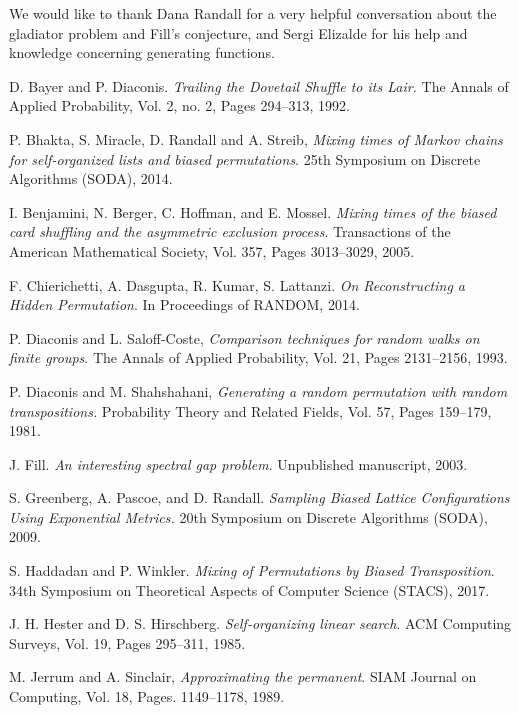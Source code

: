 \documentclass[10 pt]{article}
\begin{document}
We would like to thank Dana Randall for a very helpful conversation about the gladiator problem and Fill's conjecture,
and Sergi Elizalde for his help and knowledge concerning generating functions.  



\begin{thebibliography}{10}

  D. Bayer and P. Diaconis. \emph{Trailing the Dovetail Shuffle to its Lair.} The Annals of Applied Probability,
    Vol. 2, no. 2, Pages 294--313, 1992.

  P. Bhakta, S. Miracle, D. Randall and A. Streib, \emph{Mixing times of Markov chains for self-organized lists and biased permutations}. 25th Symposium on Discrete Algorithms (SODA), 2014.

 I. Benjamini, N. Berger, C. Hoffman, and E. Mossel. \emph{Mixing times of the biased card shuffling and the asymmetric exclusion process}. Transactions of the American Mathematical Society, Vol. 357, Pages 3013--3029, 2005.

 F. Chierichetti, A. Dasgupta, R. Kumar, S. Lattanzi. \emph{
On Reconstructing a Hidden Permutation}. In Proceedings of RANDOM, 2014.

 P. Diaconis and L. Saloff-Coste, \emph{Comparison techniques for random walks on finite groups}.
The Annals of Applied Probability, Vol. 21, Pages 2131--2156, 1993.

 P. Diaconis and M. Shahshahani, \emph{Generating a random permutation with random transpositions.}
Probability Theory and Related Fields, Vol. 57, Pages 159--179, 1981.

 J. Fill. \emph{An interesting spectral gap problem}. Unpublished manuscript, 2003.

 S. Greenberg, A. Pascoe, and D. Randall. \emph{Sampling Biased
Lattice Configurations Using Exponential Metrics.} 20th Symposium on Discrete Algorithms (SODA), 2009.

  S. Haddadan and P. Winkler. \emph{Mixing of Permutations by Biased Transposition}.
{34th Symposium on Theoretical Aspects of Computer Science (STACS)}, 2017.

 J. H. Hester  and D. S. Hirschberg.  \emph{Self-organizing linear search}. ACM
Computing Surveys, Vol. 19, Pages 295--311, 1985.

 M. Jerrum and A. Sinclair, \emph{Approximating the permanent}. SIAM Journal on Computing, Vol. 18, Pages. 1149--1178, 1989.


\end{thebibliography}
\end{document}
